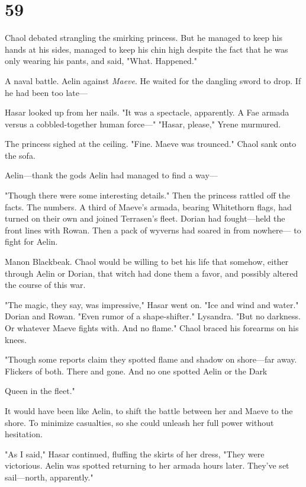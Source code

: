 
\chapter{59}

Chaol debated strangling the smirking princess. But he managed to keep his hands at his sides, managed to keep his chin high despite the fact that he was only wearing his pants, and said, "What. Happened."

A naval battle. Aelin against \emph{Maeve}. He waited for the dangling sword to drop. If he had been too late---

Hasar looked up from her nails. "It was a spectacle, apparently. A Fae armada versus a cobbled-together human force---" "Hasar, please," Yrene murmured.

The princess sighed at the ceiling. "Fine. Maeve was trounced." Chaol sank onto the sofa.

Aelin---thank the gods Aelin had managed to find a way---

"Though there were some interesting details." Then the princess rattled off the facts. The numbers. A third of Maeve's armada, bearing Whitethorn flags, had turned on their own and joined Terrasen's fleet. Dorian had fought---held the front lines with Rowan. Then a pack of wyverns had soared in from nowhere--- to fight for Aelin.

Manon Blackbeak. Chaol would be willing to bet his life that somehow, either through Aelin or Dorian, that witch had done them a favor, and possibly altered the course of this war.

"The magic, they say, was impressive," Hasar went on. "Ice and wind and water." Dorian and Rowan. "Even rumor of a shape-shifter." Lysandra. "But no darkness. Or whatever Maeve fights with. And no flame." Chaol braced his forearms on his knees.

"Though some reports claim they spotted flame and shadow on shore---far away. Flickers of both. There and gone. And no one spotted Aelin or the Dark

Queen in the fleet."

It would have been like Aelin, to shift the battle between her and Maeve to the shore. To minimize casualties, so she could unleash her full power without hesitation.

"As I said," Hasar continued, fluffing the skirts of her dress, "They were victorious. Aelin was spotted returning to her armada hours later. They've set sail---north, apparently."

